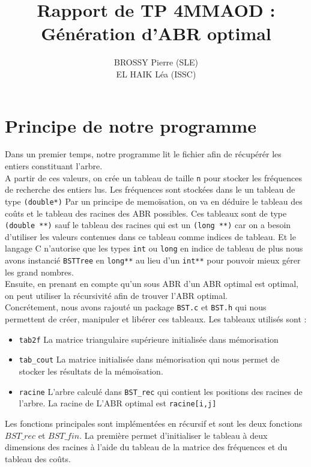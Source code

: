 \documentclass[a4paper, 10pt, french]{article}
\title{Rapport de TP 4MMAOD : Génération d'ABR optimal}
\author{
BROSSY Pierre (SLE)
\\ EL HAIK Léa (ISSC)
}
\begin{document}
\maketitle


\section{Principe de notre  programme}

Dans un premier temps, notre programme lit le fichier afin de récupérér les entiers constituant l'arbre. \\
A partir de ces valeurs, on crée un tableau de taille \texttt{n} pour stocker les fréquences de recherche des entiers lus. Les fréquences sont stockées dans le un tableau de type \texttt{(double*)}
Par un principe de memoïsation, on va en déduire le tableau des coûts et le tableau des racines des ABR possibles. Ces tableaux sont de type \texttt{(double **)} sauf le tableau des racines qui est un \texttt{(long **)} car on a besoin d'utiliser les valeurs contenues dans ce tableau comme indices de tableau. Et le langage C n'autorise que les types \texttt{int} ou \texttt{long} en indice de tableau de plus nous avons instancié \texttt{BSTTree} en \texttt{long**} au lieu d'un \texttt{int**} pour pouvoir mieux gérer les grand nombres.\\
Ensuite, en prenant en compte qu'un sous ABR d'un ABR optimal est optimal, on peut utiliser la récursivité afin de trouver l'ABR optimal. \\

Concrétement, nous avons rajouté un package \texttt{BST.c} et \texttt{BST.h} qui nous permettent de créer, manipuler et libérer ces tableaux. Les tableaux utilisés sont :\\
\begin{itemize}
\item \texttt{tab2f} La matrice triangulaire supérieure initialisée dans mémorisation
\item \texttt{tab_cout} La matrice initialisée dans mémorisation qui nous permet de stocker les résultats de la mémoïsation.
\item \texttt{racine} L'arbre calculé dans \texttt{BST\_rec} qui contient les positions des racines de l'arbre. La racine de L'ABR optimal est \texttt{racine[i,j]}
\end{itemize}

Les fonctions principales sont implémentées en récursif et sont les deux fonctions $BST\_rec$ et $BST\_fin$. La première permet d'initialiser le tableau à deux dimensions des racines à l'aide du tableau de la matrice des fréquences et du tableau des coûts. \\
\end{document}
